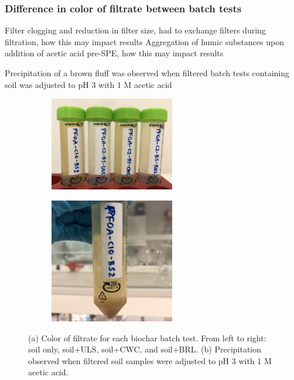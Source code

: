 \subsubsection{Difference in color of filtrate between batch tests}
Filter clogging and reduction in filter size, had to exchange filters during filtration, how this may impact results
Aggregation of humic substances upon addition of acetic acid pre-SPE, how this may impact results

Precipitation of a brown fluff was observed when filtered batch tests containing soil was adjusted to pH 3 with 1 M acetic acid

\begin{figure}
    \centering
        \begin{subfigure}[t]{\linewidth}
            \centering
            \includegraphics[width=0.6\textwidth]{Bilder/Samples/Filtrate_DOC.JPG}
            \subcaption{}
            \label{fig:filtrate}
        \end{subfigure}
        \begin{subfigure}[]{\linewidth}
            \centering
            \includegraphics[width=0.6\textwidth]{Bilder/Samples/Precipitation.jpg}
            \subcaption{}
            \label{fig:precip}
        \end{subfigure}  
        \caption{(a) Color of filtrate for each biochar batch test. From left to right: soil only, soil+ULS, soil+CWC, and soil+BRL. (b) Precipitation observed when filtered soil samples were adjusted to pH 3 with 1 M acetic acid.}
        \label{fig:DOC_tubes}
\end{figure}

